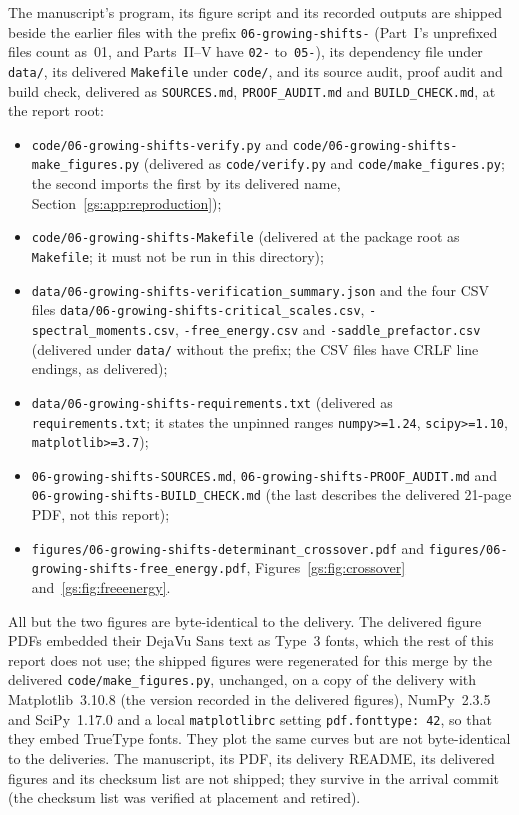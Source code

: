 \documentclass[11pt,a4paper]{article}
\numberwithin{equation}{section}
\theoremstyle{definition}
\theoremstyle{remark}
\begin{document}
The manuscript's program, its figure script and its recorded outputs are
shipped beside the earlier files with the prefix
\texttt{06-growing-shifts-} (Part~I's unprefixed files count as~01, and
Parts~II--V have \texttt{02-} to~\texttt{05-}), its dependency file under
\nolinkurl{data/}, its delivered \nolinkurl{Makefile} under
\nolinkurl{code/}, and its source audit, proof audit and build check,
delivered as \nolinkurl{SOURCES.md}, \nolinkurl{PROOF_AUDIT.md} and
\nolinkurl{BUILD_CHECK.md}, at the report root:
{\raggedright
\begin{itemize}[leftmargin=2em,itemsep=0pt,topsep=2pt]
\item \nolinkurl{code/06-growing-shifts-verify.py} and
 \nolinkurl{code/06-growing-shifts-make_figures.py} (delivered as
 \nolinkurl{code/verify.py} and \nolinkurl{code/make_figures.py}; the second
 imports the first by its delivered name, Section~\ref{gs:app:reproduction});
\item \nolinkurl{code/06-growing-shifts-Makefile} (delivered at the package
 root as \nolinkurl{Makefile}; it must not be run in this directory);
\item \nolinkurl{data/06-growing-shifts-verification_summary.json} and the
 four CSV files \nolinkurl{data/06-growing-shifts-critical_scales.csv},
 \nolinkurl{-spectral_moments.csv}, \nolinkurl{-free_energy.csv} and
 \nolinkurl{-saddle_prefactor.csv} (delivered under \nolinkurl{data/}
 without the prefix; the CSV files have CRLF line endings, as delivered);
\item \nolinkurl{data/06-growing-shifts-requirements.txt} (delivered as
 \nolinkurl{requirements.txt}; it states the unpinned ranges
 \texttt{numpy>=1.24}, \texttt{scipy>=1.10}, \texttt{matplotlib>=3.7});
\item \nolinkurl{06-growing-shifts-SOURCES.md},
 \nolinkurl{06-growing-shifts-PROOF_AUDIT.md} and
 \nolinkurl{06-growing-shifts-BUILD_CHECK.md} (the last describes the
 delivered 21-page PDF, not this report);
\item \nolinkurl{figures/06-growing-shifts-determinant_crossover.pdf} and
 \nolinkurl{figures/06-growing-shifts-free_energy.pdf}, Figures~\ref{gs:fig:crossover}
 and~\ref{gs:fig:freeenergy}.
\end{itemize}}
\noindent All but the two figures are byte-identical to the delivery.  The
delivered figure PDFs embedded their DejaVu Sans text as Type~3 fonts, which
the rest of this report does not use; the shipped figures were regenerated
for this merge by the delivered \nolinkurl{code/make_figures.py}, unchanged,
on a copy of the delivery with Matplotlib~3.10.8 (the version recorded in
the delivered figures), NumPy~2.3.5 and SciPy~1.17.0 and a local
\nolinkurl{matplotlibrc} setting \texttt{pdf.fonttype: 42}, so that they
embed TrueType fonts.  They plot the same curves but are not byte-identical
to the deliveries.  The manuscript, its PDF, its delivery README, its
delivered figures and its checksum list are not shipped; they survive in the
arrival commit (the checksum list was verified at placement and retired).
\end{document}
